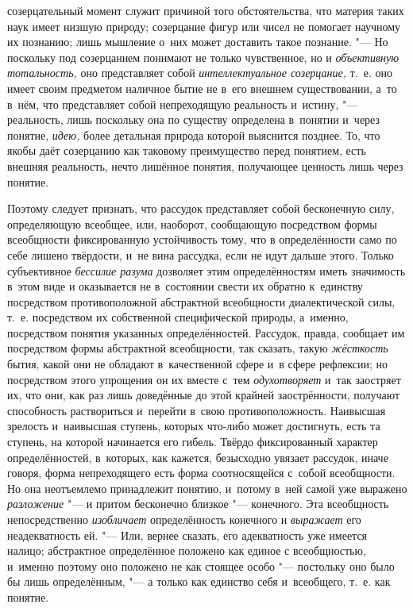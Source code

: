 созерцательный момент служит причиной того обстоятельства, что материя
таких наук имеет низшую природу; созерцание фигур или чисел не помогает
научному их познанию; лишь мышление о~них может доставить такое познание.
"--- Но поскольку под созерцанием понимают не только
чувственное, но и {\em объективную
тотальность,} оно представляет собой
{\em интеллектуальное созерцание,}
т.~е. оно имеет своим предметом наличное бытие не в~его
внешнем существовании, а~то в~нём, что представляет собой непреходящую
реальность и~истину, "--- реальность, лишь поскольку она по
существу определена в~понятии и~через понятие,
{\em идею,} более
детальная природа которой выяснится позднее. То, что якобы даёт созерцанию
как таковому преимущество перед понятием, есть внешняя реальность, нечто
лишённое понятия, получающее ценность лишь через понятие.

Поэтому следует признать, что рассудок представляет собой
бесконечную силу, определяющую всеобщее, или, наоборот, сообщающую
посредством формы всеобщности фиксированную устойчивость тому, что в
определённости само по себе лишено твёрдости, и~не вина
рассудка, если не идут дальше этого. Только субъективное
{\em бессилие разума}
дозволяет этим определённостям иметь значимость в~этом виде и
оказывается не в~состоянии свести их обратно к~единству посредством
противоположной абстрактной всеобщности диалектической силы, т.~е.
посредством их собственной специфической природы, а~именно, посредством
понятия указанных определённостей. Рассудок, правда, сообщает им
посредством формы абстрактной всеобщности, так сказать, такую
{\em жёсткость} бытия,
какой они не обладают в~качественной сфере и~в сфере рефлексии; но
посредством этого упрощения он их вместе с~тем
{\em одухотворяет} и~так
заостряет их, что они, как раз лишь доведённые до этой крайней
заострённости, получают способность раствориться и~перейти в~свою
противоположность. Наивысшая зрелость и~наивысшая ступень, которых что-либо
может достигнуть, есть та ступень, на которой начинается его гибель. Твёрдо
фиксированный характер определённостей, в~которых, как кажется, безысходно
увязает рассудок, иначе говоря, форма непреходящего есть форма
соотносящейся с~собой всеобщности. Но она неотъемлемо принадлежит понятию,
и~потому в~ней самой уже выражено
{\em разложение} "--- и
притом бесконечно близкое "--- конечного. Эта всеобщность
непосредственно {\em изобличает}
определённость конечного и
{\em выражает} его
неадекватность ей. "--- Или, вернее сказать, его адекватность
уже имеется налицо; абстрактное определённое положено как единое с
всеобщностью, и~именно поэтому оно положено не как стоящее особо
"--- постольку оно было бы лишь определённым, "--- а
только как единство себя и~всеобщего, т.~е. как понятие.


